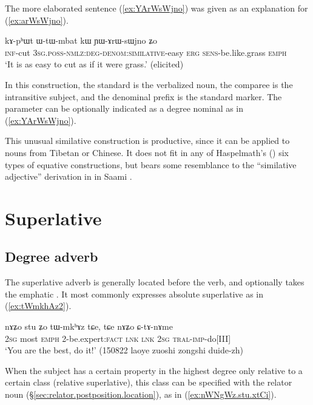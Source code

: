 The more elaborated sentence (\ref{ex:YArWsWjno}) was given as an explanation for (\ref{ex:arWsWjno}).

\begin{exe}
	\ex \label{ex:YArWsWjno}
	\gll  kɤ-pʰɯt ɯ-tɯ-mbat kɯ ɲɯ-ɤrɯ-sɯjno ʑo \\
	\textsc{inf}-cut  \textsc{3sg}.\textsc{poss}-\textsc{nmlz}:\textsc{deg}-\textsc{denom}:\textsc{similative}-easy \textsc{erg} \textsc{sens}-be.like.grass \textsc{emph} \\
	\glt `It is as easy to cut as if it were grass.' (elicited)
\end{exe}
 
In this construction, the standard is the verbalized noun, the comparee is the intransitive subject, and the denominal prefix  is the standard marker. The parameter can be optionally indicated as a degree nominal as in (\ref{ex:YArWsWjno}).

This unusual similative construction is productive, since it can be applied to nouns from Tibetan or Chinese. It does not fit in any of Haspelmath's (\citeyear{haspelmath17equative}) six types of equative constructions, but bears some resemblance to the ``similative adjective'' derivation in  in Saami \citep[5.1]{ylikovski17similarity}. 


\section{Superlative} \label{sec:superlative}
 \subsection{Degree adverb} \label{sec:stu.superlative}
The superlative adverb  is generally located before the verb, and optionally takes the emphatic . It most commonly expresses absolute superlative as in  (\ref{ex:tWmkhAz2}).
 

 \begin{exe}
\ex \label{ex:tWmkhAz2}
\gll nɤʑo stu ʑo tɯ-mkʰɤz tɕe, tɕe nɤʑo ɕ-tɤ-nɤme \\
\textsc{2sg} most \textsc{emph} 2-be.expert:\textsc{fact}   \textsc{lnk} \textsc{lnk} \textsc{2sg} \textsc{tral}-\textsc{imp}-do[III] \\
\glt `You are the best, do it!' (150822 laoye zuoshi zongshi duide-zh)
\end{exe}

When the subject has a certain property in the highest degree only relative to a certain class (relative superlative), this class can be specified with the relator noun  (§\ref{sec:relator.postposition.location}), as in  (\ref{ex:nWNgWz.stu.xtCi}).

